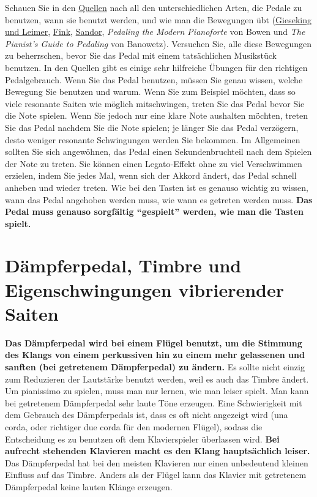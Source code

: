 Schauen Sie in den \hyperref[reference]{Quellen} nach all den unterschiedlichen Arten, die Pedale zu benutzen, wann sie benutzt werden, und wie man die Bewegungen übt (\hyperref[Gieseking]{Gieseking und Leimer}, \hyperref[Fink]{Fink}, \hyperref[Sandor]{Sandor}, \textit{Pedaling the Modern Pianoforte} von Bowen und \textit{The Pianist's Guide to Pedaling} von Banowetz).
Versuchen Sie, alle diese Bewegungen zu beherrschen, bevor Sie das Pedal mit einem tatsächlichen Musikstück benutzen.
In den Quellen gibt es einige sehr hilfreiche Übungen für den richtigen Pedalgebrauch.
Wenn Sie das Pedal benutzen, müssen Sie genau wissen, welche Bewegung Sie benutzen und warum.
Wenn Sie zum Beispiel möchten, dass so viele resonante Saiten wie möglich mitschwingen, treten Sie das Pedal bevor Sie die Note spielen.
Wenn Sie jedoch nur eine klare Note aushalten möchten, treten Sie das Pedal nachdem Sie die Note spielen; je länger Sie das Pedal verzögern, desto weniger resonante Schwingungen werden Sie bekommen.
Im Allgemeinen sollten Sie sich angewöhnen, das Pedal einen Sekundenbruchteil nach dem Spielen der Note zu treten.
Sie können einen Legato-Effekt ohne zu viel Verschwimmen erzielen, indem Sie jedes Mal, wenn sich der Akkord ändert, das Pedal schnell anheben und wieder treten.
Wie bei den Tasten ist es genauso wichtig zu wissen, wann das Pedal angehoben werden muss, wie wann es getreten werden muss.
\textbf{Das Pedal muss genauso sorgfältig \enquote{gespielt} werden, wie man die Tasten spielt.}


\section{Dämpferpedal, Timbre und Eigenschwingungen vibrierender Saiten}
\label{c1ii24}

\textbf{Das Dämpferpedal wird bei einem Flügel benutzt, um die Stimmung des Klangs von einem perkussiven hin zu einem mehr gelassenen und sanften (bei getretenem Dämpferpedal) zu ändern.}
Es sollte nicht einzig zum Reduzieren der Lautstärke benutzt werden, weil es auch das Timbre ändert.
Um pianissimo zu spielen, muss man nur lernen, wie man leiser spielt.
Man kann bei getretenem Dämpferpedal sehr laute Töne erzeugen.
Eine Schwierigkeit mit dem Gebrauch des Dämpferpedals ist, dass es oft nicht angezeigt wird (una corda, oder richtiger due corda für den modernen Flügel), sodass die Entscheidung es zu benutzen oft dem Klavierspieler überlassen wird.
\textbf{Bei aufrecht stehenden Klavieren macht es den Klang hauptsächlich leiser.}
Das Dämpferpedal hat bei den meisten Klavieren nur einen unbedeutend kleinen Einfluss auf das Timbre.
Anders als der Flügel kann das Klavier mit getretenem Dämpferpedal keine lauten Klänge erzeugen.

